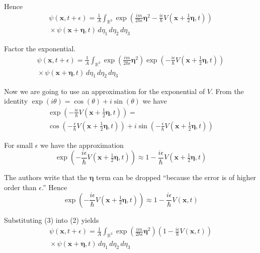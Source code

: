 \documentclass[12pt]{article}
\begin{document}
Hence
\begin{multline*}
\psi(\mathbf{x},t+\epsilon)=
\frac{1}{A}\int_{\mathbb R^3}
\exp\left(
\frac{im}{2\hbar\epsilon}\boldsymbol\eta^2
-\frac{i\epsilon}{\hbar} V\left(\mathbf x+\tfrac{1}{2}\boldsymbol\eta,t\right)
\right)
\\
{}\times\psi(\mathbf{x}+\boldsymbol\eta,t)\,d\eta_1\,d\eta_2\,d\eta_3
\end{multline*}

Factor the exponential.
\begin{multline*}
\psi(\mathbf{x},t+\epsilon)=
\frac{1}{A}\int_{\mathbb R^3}
\exp\left(\frac{im}{2\hbar\epsilon}\boldsymbol\eta^2\right)
\exp\left(-\frac{i\epsilon}{\hbar}V\left(\mathbf x+\tfrac{1}{2}\boldsymbol\eta,t\right)\right)
\\
{}\times\psi(\mathbf{x}+\boldsymbol\eta,t)\,d\eta_1\,d\eta_2\,d\eta_3
\tag{2}
\end{multline*}

Now we are going to use an approximation for the exponential of $V$.
From the identity $\exp(i\theta)=\cos(\theta)+i\sin(\theta)$ we have
\begin{multline*}
\exp\left(-\frac{i\epsilon}{\hbar}V\left(\mathbf x+\tfrac{1}{2}\boldsymbol\eta,t\right)\right)=
\\
\cos\left(-\frac{\epsilon}{\hbar}V\left(\mathbf x+\tfrac{1}{2}\boldsymbol\eta,t\right)\right)
+i\sin\left(-\frac{\epsilon}{\hbar}V\left(\mathbf x+\tfrac{1}{2}\boldsymbol\eta,t\right)\right)
\end{multline*}

For small $\epsilon$ we have the approximation
\begin{equation*}
\exp\left(-\frac{i\epsilon}{\hbar}V\left(\mathbf x+\tfrac{1}{2}\boldsymbol\eta,t\right)\right)\approx
1-\frac{i\epsilon}{\hbar}V\left(\mathbf x+\tfrac{1}{2}\boldsymbol\eta,t\right)
\end{equation*}

The authors write that the $\boldsymbol\eta$ term can be dropped
``because the error is of higher order than $\epsilon$.''
Hence
\begin{equation*}
\exp\left(-\frac{i\epsilon}{\hbar}V\left(\mathbf x+\tfrac{1}{2}\boldsymbol\eta,t\right)\right)\approx
1-\frac{i\epsilon}{\hbar}V\left(\mathbf x,t\right)
\tag{3}
\end{equation*}

Substituting (3) into (2) yields
\begin{multline*}
\psi(\mathbf{x},t+\epsilon)=
\frac{1}{A}\int_{\mathbb R^3}
\exp\left(\frac{im}{2\hbar\epsilon}\boldsymbol\eta^2\right)
\left(1-\frac{i\epsilon}{\hbar}V\left(\mathbf x,t\right)\right)
\\
{}\times\psi(\mathbf x+\boldsymbol\eta,t)\,d\eta_1\,d\eta_2\,d\eta_3
\tag{4}
\end{multline*}
\end{document}
